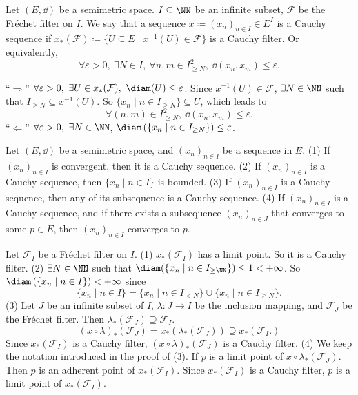 \begin{definitionenv}
    Let $(E,\dd)$ be a semimetric space. $I\subseteq \NN$ be an infinite subset, $\mathcal{F}$ be the Fréchet filter on $I$. We say that a sequence $x\coloneq (x_n)_{n\in I}\in E^I$ is a Cauchy sequence if $x_*(\mathcal{F})\coloneqq\{U\subseteq E\mid x^{-1}(U)\in \mathcal{F}\}$ is a Cauchy filter. Or equivalently,
    $$\forall \varepsilon>0,\ \exists N\in I,\ \forall n,m\in I^2_{\ge N},\ \dd(x_n,x_m)\le \varepsilon.$$
\end{definitionenv}
\begin{proofenv}
    ``$\Rightarrow$'' $\forall \varepsilon>0,\ \exists U\in x_*(\mathcal{F}),\ \diam(U)\le\varepsilon$. Since $x^{-1}(U)\in \mathcal{F}$, $\exists N\in \NN$ such that $I_{\ge N}\subseteq x^{-1}(U)$. So $\{x_n\mid n\in I_{\ge N}\}\subseteq U$, which leads to 
    $$\forall (n,m)\in I_{\ge N}^2,\ \dd(x_n,x_m)\le \varepsilon.$$
    ``$\Leftarrow$'' $\forall \varepsilon>0,\ \exists N\in \NN$, $\diam\left(\{x_n\mid n\in I_{\ge N}\}\right)\le \varepsilon$.
\end{proofenv}
\begin{propositionenv}
    Let $(E,\dd)$ be a semimetric space, and $(x_n)_{n\in I}$ be a sequence in $E$.
    \newline
    (1) If $(x_n)_{n\in I}$ is convergent, then it is a Cauchy sequence.
    \newline
    (2) If $(x_n)_{n\in I}$ is a Cauchy sequence, then $\{x_n\mid n\in I\}$ is bounded.
    \newline
    (3) If $(x_n)_{n\in I}$ is a Cauchy sequence, then any of its subsequence is a Cauchy sequence.
    \newline
    (4) If $(x_n)_{n\in I}$ is a Cauchy sequence, and if there exists a subsequence $(x_n)_{n\in J}$ that converges to some $p\in E$, then $(x_n)_{n\in I}$ converges to $p$.
\end{propositionenv}
\begin{proofenv}
    Let $\mathcal{F}_I$ be a Fréchet filter on $I$.
    \newline
    (1) $x_*(\mathcal{F}_I)$ has a limit point. So it is a Cauchy filter. 
    \newline
    (2) $\exists N\in \NN$ such that $\diam(\{x_n\mid n\in I_{\ge \NN}\})\le 1<+\infty$. So $\diam\left(\{x_n\mid n\in I\}\right)<+\infty$ since
    $$\{x_n\mid n\in I\}=\{x_n\mid n\in I_{< N}\}\cup\{x_n\mid n\in I_{\ge N}\}.$$
    (3) Let $J$ be an infinite subset of $I$, $\lambda:J\longrightarrow I$ be the inclusion mapping, and $\mathcal{F}_J$ be the Fréchet filter. Then $\lambda_*(\mathcal{F}_J)\supseteq \mathcal{F}_I$.
    $$(x\circ \lambda)_*(\mathcal{F}_J)=x_*(\lambda_*(\mathcal{F}_J))\supseteq x_*(\mathcal{F}_I.)$$
    Since $x_*(\mathcal{F}_I)$ is a Cauchy filter, $(x\circ \lambda)_*(\mathcal{F}_J)$ is a Cauchy filter.
    \newline
    (4) We keep the notation introduced in the proof of (3). If $p$ is a limit point of $x\circ \lambda_*\left(\mathcal{F}_J\right)$. Then $p$ is an adherent point of $x_*(\mathcal{F}_I)$. Since $x_*(\mathcal{F}_I)$  is a Cauchy filter, $p$ is a limit point of $x_*(\mathcal{F}_I)$. 
\end{proofenv}

